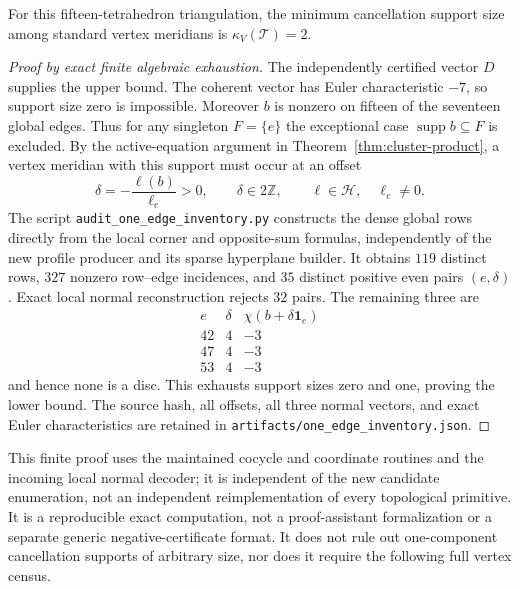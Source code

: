 \begin{proposition}
\label{prop:cluster-fixture-minimum}
For this fifteen-tetrahedron triangulation, the minimum cancellation
support size among standard vertex meridians is
$\kappa_V(\mathcal T)=2$.
\end{proposition}

\begin{proof}[Proof by exact finite algebraic exhaustion]
The independently certified vector $D$ supplies the upper bound.  The
coherent vector has Euler characteristic $-7$, so support size zero is
impossible.  Moreover $b$ is nonzero on fifteen of the seventeen global
edges.  Thus for any singleton $F=\{e\}$ the exceptional case
$\operatorname{supp}b\subseteq F$ is excluded.  By the active-equation
argument in Theorem~\ref{thm:cluster-product}, a vertex meridian with
this support must occur at an offset
\[
       \delta=-\frac{\ell(b)}{\ell_e}>0,
       \qquad \delta\in 2\mathbb Z,
       \qquad \ell\in\mathcal H,\quad \ell_e\ne0.
\]
The script \texttt{audit\_one\_edge\_inventory.py} constructs the dense
global rows directly from the local corner and opposite-sum formulas,
independently of the new profile producer and its sparse hyperplane
builder.  It obtains $119$ distinct rows, $327$ nonzero row--edge
incidences, and $35$ distinct positive even pairs $(e,\delta)$.  Exact
local normal reconstruction rejects $32$ pairs.  The remaining three
are
\[
\begin{array}{c|r|r}
e&\delta&\chi(b+\delta\mathbf 1_e)\\ \hline
42&4&-3\\
47&4&-3\\
53&4&-3
\end{array}
\]
and hence none is a disc.  This exhausts support sizes zero and one,
proving the lower bound.  The source hash, all offsets, all three normal
vectors, and exact Euler characteristics are retained in
\texttt{artifacts/one\_edge\_inventory.json}.
\end{proof}

This finite proof uses the maintained cocycle and coordinate routines
and the incoming local normal decoder; it is independent of the new
candidate enumeration, not an independent reimplementation of every
topological primitive.  It is a reproducible exact computation, not a
proof-assistant formalization or a separate generic negative-certificate
format.  It does not rule out one-component cancellation supports of
arbitrary size, nor does it require the following full vertex census.

